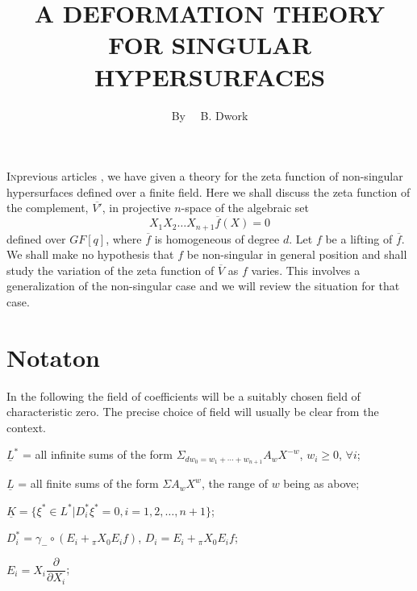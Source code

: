 \title{A DEFORMATION THEORY FOR SINGULAR HYPERSURFACES}

\author{By~~ B. Dwork}

\date{}

\maketitle

\setcounter{pageoriginal}{84}
\textsc{In}\pageoriginale previous articles \cite{art07-key1}, \cite{art07-key2}
 we have given a theory for the zeta function of non-singular hypersurfaces defined over a finite field. Here we shall discuss the zeta function of the complement, $\overline{V'}$, in projective $n$-space of the algebraic set
$$
X_{1}X_{2}\ldots X_{n+1}\overline{f}(X)=0
$$
defined over $GF[q]$, where $\overline{f}$ is homogeneous of degree $d$. Let $f$ be a lifting of $\overline{f}$. We shall make no hypothesis that $f$ be non-singular in general position and shall study the variation of the zeta function of $\overline{V}$ as $f$ varies. This involves a generalization of the non-singular case and we will review the situation for that case.

\section{Notaton}\label{art07-sec1}

In the following the field of coefficients will be a suitably chosen field of characteristic zero. The precise choice of field will usually be clear from the context.

\smallskip

$\underline{L}^{*}$ = all infinite sums of the form $\Sigma_{dw_{0}=w_{1}+\cdots+w_{n+1}}A_{w}X^{-w}$, $w_{i}\geq 0$, $\forall i$;

\smallskip

$\underline{L}$ = all finite sums of the form $\Sigma A_{w}X^{w}$, the range of $w$ being as above;

\smallskip

$\underline{K}=\{\xi^{*}\in L^{*}|D^{*}_{i}\xi^{*}=0,i=1,2,\ldots,n+1\}$;

\smallskip

$D^{*}_{i}=\gamma_{-}\circ (E_{i}+{}_{\pi}X_{0}E_{i}f)$, $D_{i}=E_{i}+{}_{\pi}X_{0}E_{i}f$;

\smallskip

$E_{i}=X_{i}\dfrac{\partial}{\partial X_{i}}$;


